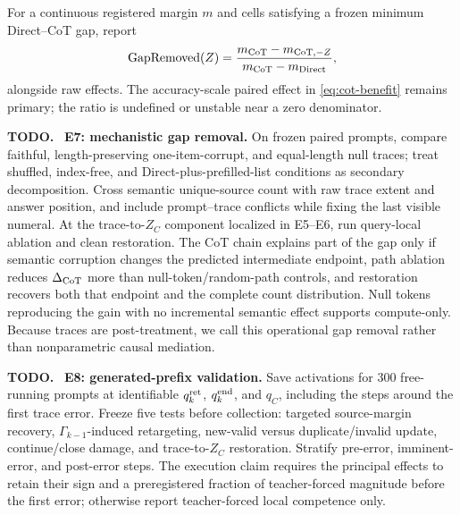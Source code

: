 \documentclass[11pt]{article}
\newenvironment{todobox}
  {\begin{center}\begin{minipage}{0.95\linewidth}\color{todored}\textbf{TODO.}~}
  {\end{minipage}\end{center}}
\begin{document}
For a continuous registered margin $m$ and cells satisfying a frozen minimum Direct--CoT gap, report
\begin{equation}
\operatorname{GapRemoved}(Z)=
\frac{m_{\rm CoT}-m_{{\rm CoT},-Z}}
{m_{\rm CoT}-m_{\rm Direct}},
\label{eq:gap-removed}
\end{equation}
alongside raw effects. The accuracy-scale paired effect in \cref{eq:cot-benefit} remains primary; the ratio is undefined or unstable near a zero denominator.

\begin{todobox}
\textbf{E7: mechanistic gap removal.} On frozen paired prompts, compare faithful, length-preserving one-item-corrupt, and equal-length null traces; treat shuffled, index-free, and Direct-plus-prefilled-list conditions as secondary decomposition. Cross semantic unique-source count with raw trace extent and answer position, and include prompt--trace conflicts while fixing the last visible numeral. At the trace-to-$Z_C$ component localized in E5--E6, run query-local ablation and clean restoration. The CoT chain explains part of the gap only if semantic corruption changes the predicted intermediate endpoint, path ablation reduces $\Delta_{\rm CoT}$ more than null-token/random-path controls, and restoration recovers both that endpoint and the complete count distribution. Null tokens reproducing the gain with no incremental semantic effect supports compute-only. Because traces are post-treatment, we call this operational gap removal rather than nonparametric causal mediation.
\end{todobox}

\begin{todobox}
\textbf{E8: generated-prefix validation.} Save activations for 300 free-running prompts at identifiable $q_k^{\rm ret}$, $q_k^{\rm end}$, and $q_C$, including the steps around the first trace error. Freeze five tests before collection: targeted source-margin recovery, $\Gamma_{k-1}$-induced retargeting, new-valid versus duplicate/invalid update, continue/close damage, and trace-to-$Z_C$ restoration. Stratify pre-error, imminent-error, and post-error steps. The execution claim requires the principal effects to retain their sign and a preregistered fraction of teacher-forced magnitude before the first error; otherwise report teacher-forced local competence only.
\end{todobox}
\end{document}
